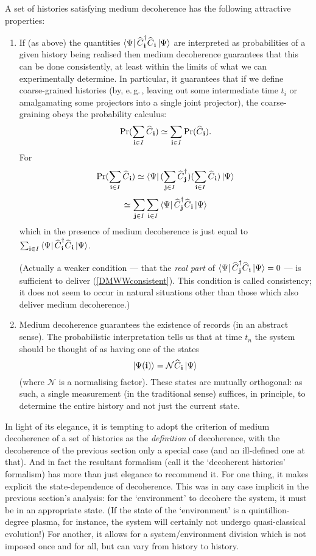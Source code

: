 \documentclass[12pt]{article}
\newcommand{\egc}{\mbox{e.\,g.\,}}
\newcommand{\be}{\begin{equation}}
\newcommand{\ee}{\end{equation}}
\newcommand{\vctr}[1]{\ensuremath{\mathbf{ #1 }}}
\newcommand{\mc}[1]{\ensuremath{\mathcal{#1}}}
\newcommand{\ket}[1]{\ensuremath{\left|  #1 \right\rangle}}
\newcommand{\bra}[1]{\ensuremath{\left\langle #1 \right|}}
\newcommand{\matel}[3]{\ensuremath{\bra{#1} #2 \ket{#3}}}
\newcommand{\op}[1]{\ensuremath{\widehat{\textsf{\ensuremath{#1}}}}}
\newcommand{\opad}[1]{\ensuremath{\op{#1}^{\dagger}}}
\begin{document}
A set of histories satisfying medium decoherence  has the following attractive properties:
\begin{enumerate}
\item If (as above) the quantities $\matel{\Psi}{\opad{C}_{\vctr{i}}\op{C}_{\vctr{i}}}{\Psi}$ are interpreted as probabilities of a given history being realised  then medium decoherence guarantees that this can be done consistently, at least within the limits of what we can experimentally determine. In particular, it guarantees that if we define coarse-grained histories (by, \egc, leaving out some intermediate time $t_i$ or amalgamating some projectors into a single joint projector), the coarse-graining obeys the probability calculus:
\be\label{DMWWconsistent}\Pr(\sum_{\vctr{i}\in I}\op{C}_{\vctr{i}})\simeq \sum_{\vctr{i}\in I}\Pr(\op{C}_{\vctr{i}}).\ee
For 
\[ \Pr(\sum_{\vctr{i}\in I}\op{C}_{\vctr{i}})\simeq \matel{\Psi}{(\sum_{\vctr{j}\in I}\opad{C}_{\vctr{j}})(\sum_{\vctr{i}\in I}\op{C}_{\vctr{i}})}{\Psi}
\]
\be
\simeq\sum_{\vctr{j}\in I}\sum_{\vctr{i}\in I}\matel{\Psi}{\opad{C}_{\vctr{j}}\op{C}_{\vctr{i}}}{\Psi}
\ee
which in the presence of medium decoherence is just equal to $\sum_{\vctr{i}\in I}\matel{\Psi}{\opad{C}_{\vctr{i}}\op{C}_{\vctr{i}}}{\Psi}$.

(Actually a weaker condition --- that the \emph{real part} of $\matel{\Psi}{\opad{C}_{\vctr{j}}\op{C}_{\vctr{i}}}{\Psi}=0$ --- is sufficient to deliver (\ref{DMWWconsistent}). This condition is called consistency;  it does not seem to occur in natural situations other than those which also deliver medium decoherence.)
\item Medium decoherence guarantees the existence of records (in an abstract sense). The probabilistic interpretation tells us that at time $t_n$ the system should be thought of as having one of the states
\be \ket{\Psi(\vctr{i})}=\mc{N}\op{C}_\vctr{i}\ket{\Psi}\ee
(where \mc{N} is a normalising factor). These states are mutually orthogonal: as such, a single measurement (in the traditional sense) suffices, in principle, to determine the entire history and not just the current state. 
\end{enumerate}
In light of its elegance, it is tempting to adopt the criterion of medium decoherence of a set of histories as the \emph{definition} of decoherence, with the decoherence of the previous section only a special case (and an ill-defined one at that). And in fact the resultant formalism (call it the `decoherent histories' formalism) has more than just elegance to recommend it. For one thing, it makes explicit the state-dependence of decoherence. This was in any case implicit in the previous section's analysis: for the `environment' to decohere the system, it must be in an appropriate state. (If the state of the `environment' is a quintillion-degree plasma, for instance, the system will certainly not undergo quasi-classical evolution!) For another, it allows for a system/environment division which is not imposed once and for all, but can vary from history to history. 
\end{document}
